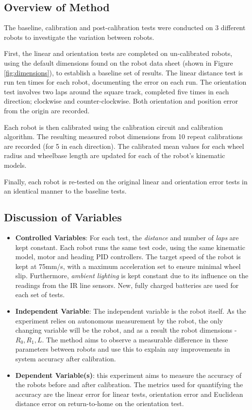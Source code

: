 \documentclass[conference]{IEEEtran}
\begin{document}
\subsection{Overview of Method}

The baseline, calibration and post-calibration tests were conducted on 3 different robots to investigate the variation between robots. 

First, the linear and orientation tests are completed on un-calibrated robots, using the default dimensions found on the robot data sheet \cite{pololu_guide} (shown in Figure \ref{fig:dimensions}), to establish a baseline set of results. 
The linear distance test is run ten times for each robot, documenting the error on each run. 
The orientation test involves two laps around the square track, completed five times in each direction; clockwise and counter-clockwise.
Both orientation and position error from the origin are recorded.

Each robot is then calibrated using the calibration circuit and calibration algorithm. 
The resulting measured robot dimensions from 10 repeat calibrations are recorded (for 5 in each direction).
The calibrated mean values for each wheel radius and wheelbase length are updated for each of the robot's kinematic models. 

Finally, each robot is re-tested on the original linear and orientation error tests in an identical manner to the baseline tests. 

\subsection{Discussion of Variables}

\begin{itemize}
    \item \textbf{Controlled Variables}: 
    For each test, the \emph{distance} and number of \emph{laps} are kept constant. 
    Each robot runs the same test code, using the same kinematic model, motor and heading PID controllers. 
    The target speed of the robot is kept at 75mm/s, with a maximum acceleration set to ensure minimal wheel slip.
    Furthermore, \emph{ambient lighting} is kept constant due to its influence on the readings from the IR line sensors. 
    New, fully charged batteries are used for each set of tests.
    \item \textbf{Independent Variable}: 
    The independent variable is the robot itself. 
    As the experiment relies on autonomous measurement by the robot, the only changing variable will be the robot, and as a result the robot dimensions - $R_0, R_1, L$. 
    The method aims to observe a measurable difference in these parameters between robots and use this to explain any improvements in system accuracy after calibration. 
    \item \textbf{Dependent Variable(s)}: this experiment aims to measure the accuracy of the robots before and after calibration. The metrics used for quantifying the accuracy are the linear error for linear tests, orientation error and Euclidean distance error on return-to-home on the orientation test.
\end{itemize}
\end{document}
